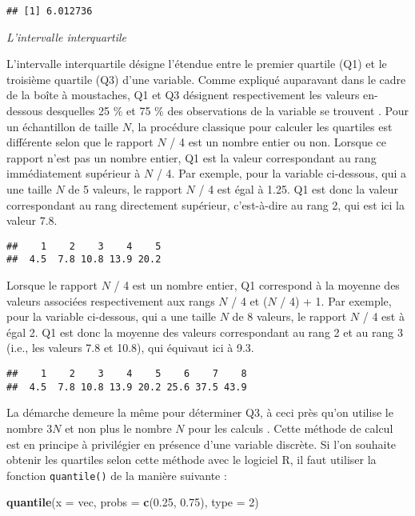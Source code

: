 \documentclass[
  french,
]{book}
\newenvironment{Shaded}{\begin{snugshade}}{\end{snugshade}}
\newcommand{\DataTypeTok}[1]{\textcolor[rgb]{0.13,0.29,0.53}{#1}}
\newcommand{\DecValTok}[1]{\textcolor[rgb]{0.00,0.00,0.81}{#1}}
\newcommand{\FloatTok}[1]{\textcolor[rgb]{0.00,0.00,0.81}{#1}}
\newcommand{\KeywordTok}[1]{\textcolor[rgb]{0.13,0.29,0.53}{\textbf{#1}}}
\newcommand{\NormalTok}[1]{#1}
\begin{document}
\begin{verbatim}
## [1] 6.012736
\end{verbatim}

\emph{L'intervalle interquartile}

L'intervalle interquartile désigne l'étendue entre le premier quartile (Q1) et le troisième quartile (Q3) d'une variable. Comme expliqué auparavant dans le cadre de la boîte à moustaches, Q1 et Q3 désignent respectivement les valeurs en-dessous desquelles 25 \% et 75 \% des observations de la variable se trouvent \autocite{chatellierMoyenneMedianeLeurs2003}. Pour un échantillon de taille \(N\), la procédure classique pour calculer les quartiles est différente selon que le rapport \(N\) / 4 est un nombre entier ou non. Lorsque ce rapport n'est pas un nombre entier, Q1 est la valeur correspondant au rang immédiatement supérieur à \(N\) / 4. Par exemple, pour la variable ci-dessous, qui a une taille \(N\) de 5 valeurs, le rapport \(N\) / 4 est égal à 1.25. Q1 est donc la valeur correspondant au rang directement supérieur, c'est-à-dire au rang 2, qui est ici la valeur 7.8.

\begin{verbatim}
##    1    2    3    4    5 
##  4.5  7.8 10.8 13.9 20.2
\end{verbatim}

Lorsque le rapport \(N\) / 4 est un nombre entier, Q1 correspond à la moyenne des valeurs associées respectivement aux rangs \(N\) / 4 et (\(N\) / 4) + 1. Par exemple, pour la variable ci-dessous, qui a une taille \(N\) de 8 valeurs, le rapport \(N\) / 4 est à égal 2. Q1 est donc la moyenne des valeurs correspondant au rang 2 et au rang 3 (i.e., les valeurs 7.8 et 10.8), qui équivaut ici à 9.3.

\begin{verbatim}
##    1    2    3    4    5    6    7    8 
##  4.5  7.8 10.8 13.9 20.2 25.6 37.5 43.9
\end{verbatim}

La démarche demeure la même pour déterminer Q3, à ceci près qu'on utilise le nombre 3\(N\) et non plus le nombre \(N\) pour les calculs \autocite{labreucheDifferentsTypesVariables2010}. Cette méthode de calcul est en principe à privilégier en présence d'une variable discrète. Si l'on souhaite obtenir les quartiles selon cette méthode avec le logiciel R, il faut utiliser la fonction \texttt{quantile()} de la manière suivante :

\begin{Shaded}
\begin{Highlighting}[]
\KeywordTok{quantile}\NormalTok{(}\DataTypeTok{x =}\NormalTok{ vec, }\DataTypeTok{probs =} \KeywordTok{c}\NormalTok{(}\FloatTok{0.25}\NormalTok{, }\FloatTok{0.75}\NormalTok{), }\DataTypeTok{type =} \DecValTok{2}\NormalTok{)}
\end{Highlighting}
\end{Shaded}
\end{document}

